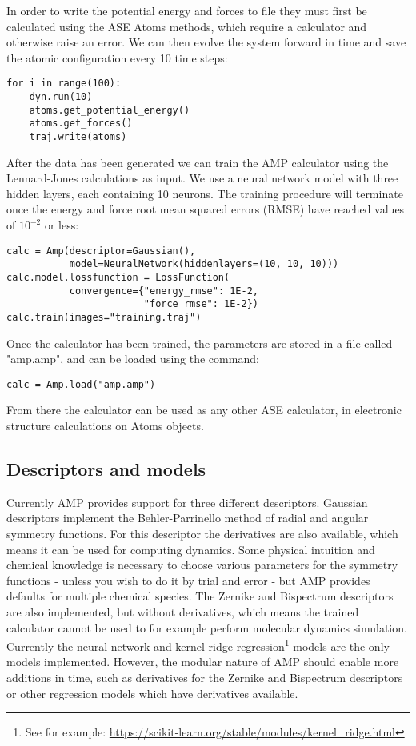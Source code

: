 In order to write the potential energy and forces to file
they must first be calculated using the ASE Atoms methods,
which require a calculator and otherwise raise an error.
We can then evolve the system forward in time
and save the atomic configuration every 10 time steps:

\begin{verbatim}
for i in range(100):
    dyn.run(10)
    atoms.get_potential_energy()
    atoms.get_forces()
    traj.write(atoms)
\end{verbatim}

After the data has been generated we can train the AMP calculator
using the Lennard-Jones calculations as input. 
We use a neural network model with three hidden layers,
each containing 10 neurons.
The training procedure
will terminate once the energy and force root mean squared errors (RMSE)
have reached values of $10^{-2}$ or less:

\begin{verbatim}
calc = Amp(descriptor=Gaussian(),
           model=NeuralNetwork(hiddenlayers=(10, 10, 10)))
calc.model.lossfunction = LossFunction(
           convergence={"energy_rmse": 1E-2,
                        "force_rmse": 1E-2})
calc.train(images="training.traj")
\end{verbatim}

Once the calculator has been trained, the parameters
are stored in a file called "amp.amp",
and can be loaded using the command:

\begin{verbatim}
calc = Amp.load("amp.amp")
\end{verbatim}

From there the calculator can be used as any other ASE calculator,
in electronic structure calculations on Atoms objects.

\subsection{Descriptors and models}
Currently AMP provides support for three different descriptors.
Gaussian descriptors implement the Behler-Parrinello method
of radial and angular symmetry functions. For this descriptor
the derivatives are also available, which means it can be used
for computing dynamics. Some physical intuition and chemical knowledge
is necessary to choose various parameters for the symmetry functions -
unless you wish to do it by trial and error - but AMP provides
defaults for multiple chemical species.
The Zernike and Bispectrum descriptors are also implemented,
but without derivatives, which means the trained calculator
cannot be used to for example perform molecular dynamics simulation.
Currently the neural network and kernel ridge regression\footnote{
    See for example: \url{
        https://scikit-learn.org/stable/modules/kernel_ridge.html}}
models are the only models implemented.
However, the modular nature of AMP should enable more additions
in time, such as derivatives for the Zernike and Bispectrum descriptors
or other regression models which have derivatives available.
